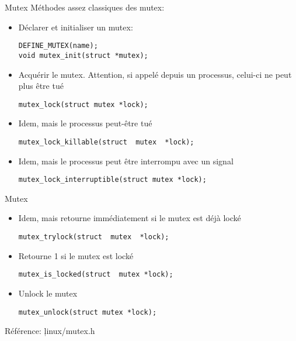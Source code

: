 \begin{frame}[fragile=singleslide]{Mutex}
  Méthodes assez classiques des mutex:
  \begin{itemize}
  \item Déclarer et initialiser un mutex:
    \begin{lstlisting}
DEFINE_MUTEX(name);
void mutex_init(struct *mutex);
    \end{lstlisting}
  \item Acquérir le mutex.   Attention, si appelé depuis un processus,
    celui-ci ne peut plus être tué
    \begin{lstlisting}
mutex_lock(struct mutex *lock);
    \end{lstlisting}
  \item Idem, mais le processus peut-être tué
    \begin{lstlisting}
mutex_lock_killable(struct  mutex  *lock);
    \end{lstlisting}
  \item Idem, mais le processus peut être interrompu avec un signal
    \begin{lstlisting}
mutex_lock_interruptible(struct mutex *lock);
    \end{lstlisting}
  \end{itemize}
\end{frame}

\begin{frame}[fragile=singleslide]{Mutex}
  \begin{itemize}
  \item Idem, mais retourne immédiatement si le mutex est déjà locké
    \begin{lstlisting}
mutex_trylock(struct  mutex  *lock);
    \end{lstlisting}
  \item Retourne 1 si le mutex est locké
    \begin{lstlisting}
mutex_is_locked(struct  mutex *lock);
    \end{lstlisting}
  \item  Unlock le mutex
    \begin{lstlisting}
mutex_unlock(struct mutex *lock);
    \end{lstlisting}
  \end{itemize}
  Référence: \c{linux/mutex.h}
\end{frame}

